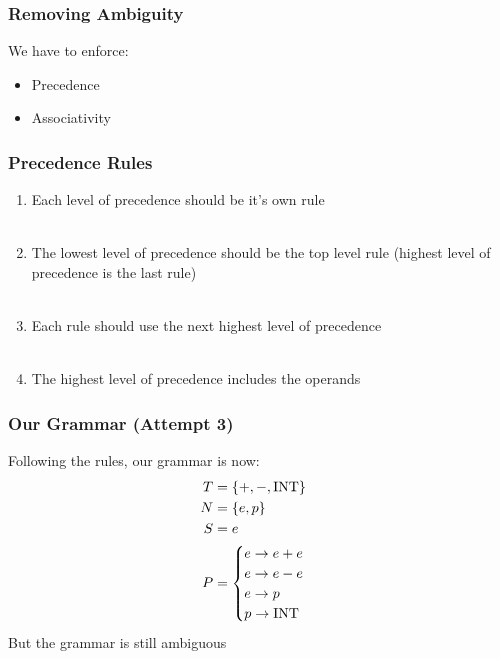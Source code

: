 \documentclass[aspectratio=169]{beamer}
\begin{document}
\begin{frame}
\frametitle{Removing Ambiguity}

We have to enforce:
\begin{itemize}
  \item Precedence
  \item Associativity
\end{itemize}
\end{frame}

\begin{frame}
\frametitle{Precedence Rules}

\begin{enumerate}
  \item Each level of precedence should be it's own rule\\~\\
  \item The lowest level of precedence should be the top level rule
    (highest level of precedence is the last rule)\\~\\
  \item Each rule should use the next highest level of precedence\\~\\
  \item The highest level of precedence includes the operands
\end{enumerate}
\end{frame}

\begin{frame}
\frametitle{Our Grammar (Attempt 3)}

Following the rules, our grammar is now:
\begin{align*}
T &= \{ +, -, \text{\lstinline{INT}} \}\\
N &= \{ e, p \}\\
S &= e\\
P &= \begin{cases}e \rightarrow e + e \\
     e \rightarrow e - e\\
     e \rightarrow p\\
     p \rightarrow \text{\lstinline{INT}}\end{cases}
\end{align*}
But the grammar is still ambiguous 
\end{frame}
\end{document}
